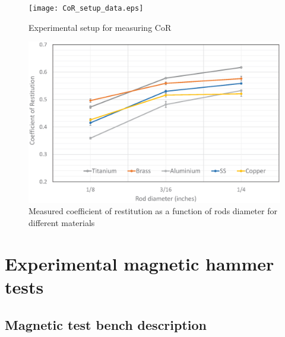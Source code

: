 \documentclass[letterpaper, 10 pt, conference]{ieeeconf}  %
\begin{document}
\begin{figure}
	\texttt{[image: CoR\_setup\_data.eps]}
	\caption{Experimental setup for measuring CoR}
	\label{CoR_setup_data}
\end{figure}

\begin{figure}
	\includegraphics[width=\columnwidth]{CoR_measurements.eps}
	\caption{Measured coefficient of restitution as a function of rods diameter for different materials}
	\label{CoR_Results}
\end{figure}





\section{Experimental magnetic hammer tests}
\label{experiment}
\subsection{Magnetic test bench description}
\end{document}
